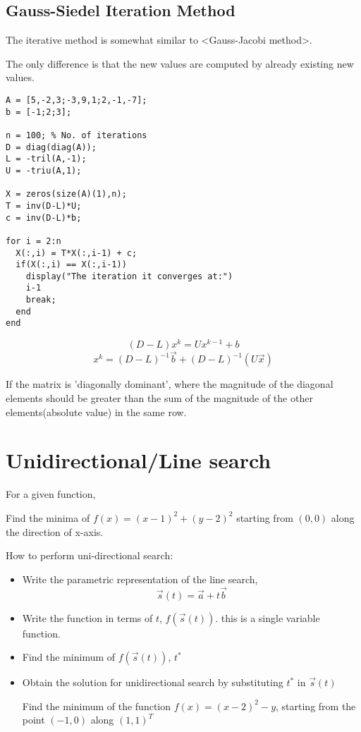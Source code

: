 \documentclass[11pt]{report}
\begin{document}
\section{Gauss-Siedel Iteration Method}
\label{sec:org4655ec5}
The iterative method is somewhat similar to <Gauss-Jacobi method>.

The only difference is that the new values are computed by already existing new values.

\begin{verbatim}
A = [5,-2,3;-3,9,1;2,-1,-7];
b = [-1;2;3];

n = 100; % No. of iterations
D = diag(diag(A));
L = -tril(A,-1);
U = -triu(A,1);

X = zeros(size(A)(1),n);
T = inv(D-L)*U;
c = inv(D-L)*b;

for i = 2:n
  X(:,i) = T*X(:,i-1) + c;
  if(X(:,i) == X(:,i-1))
    display("The iteration it converges at:")
    i-1
    break;
  end
end
\end{verbatim}

$$(D-L)x^{k} = Ux^{k-1} + b$$
$$x^{k} = (D-L)^{-1} \vec{b} + (D-L)^{-1}(U \vec{x})$$

If the matrix is 'diagonally dominant', where the magnitude of the diagonal elements should be greater than the sum of the magnitude of the other elements(absolute value) in the same row.
\chapter{Unidirectional/Line search}
\label{sec:org2b9409a}
For a given function,

Find the minima of \(f(x) = (x-1)^2 + (y-2)^2\) starting from \((0,0)\) along the direction of x-axis.

How to perform uni-directional search:
\begin{itemize}
\item Write the parametric representation of the line search, $$\vec{s}(t) = \vec{a} + t\vec{b}$$
\item Write the function in terms of \(t\), \(f(\vec{s}(t))\). this is a single variable function.
\item Find the minimum of \(f(\vec{s}(t))\), \(t^*\)
\item Obtain the solution for unidirectional search by substituting \(t^*\) in \(\vec{s}(t)\)

Find the minimum of the function \(f(x) = (x-2)^2 - y\), starting from the point \((-1,0)\) along \((1,1)^T\)
\end{itemize}
\end{document}
